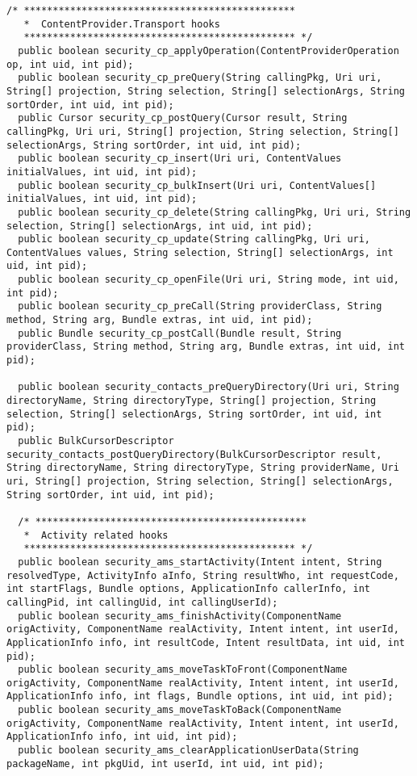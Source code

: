 \documentclass[letterpaper,twocolumn,10pt]{article}
\begin{document}
\begin{lstlisting}[emph={},basicstyle=\footnotesize,caption={Interface for Access Control Policy Modules}]
  /* ***********************************************
   *  ContentProvider.Transport hooks
   *********************************************** */
  public boolean security_cp_applyOperation(ContentProviderOperation op, int uid, int pid);
  public boolean security_cp_preQuery(String callingPkg, Uri uri, String[] projection, String selection, String[] selectionArgs, String sortOrder, int uid, int pid);
  public Cursor security_cp_postQuery(Cursor result, String callingPkg, Uri uri, String[] projection, String selection, String[] selectionArgs, String sortOrder, int uid, int pid);
  public boolean security_cp_insert(Uri uri, ContentValues initialValues, int uid, int pid);
  public boolean security_cp_bulkInsert(Uri uri, ContentValues[] initialValues, int uid, int pid);
  public boolean security_cp_delete(String callingPkg, Uri uri, String selection, String[] selectionArgs, int uid, int pid);
  public boolean security_cp_update(String callingPkg, Uri uri, ContentValues values, String selection, String[] selectionArgs, int uid, int pid);
  public boolean security_cp_openFile(Uri uri, String mode, int uid, int pid);
  public boolean security_cp_preCall(String providerClass, String method, String arg, Bundle extras, int uid, int pid);
  public Bundle security_cp_postCall(Bundle result, String providerClass, String method, String arg, Bundle extras, int uid, int pid);
  
  public boolean security_contacts_preQueryDirectory(Uri uri, String directoryName, String directoryType, String[] projection, String selection, String[] selectionArgs, String sortOrder, int uid, int pid);
  public BulkCursorDescriptor security_contacts_postQueryDirectory(BulkCursorDescriptor result, String directoryName, String directoryType, String providerName, Uri uri, String[] projection, String selection, String[] selectionArgs, String sortOrder, int uid, int pid);
  
  /* ***********************************************
   *  Activity related hooks
   *********************************************** */
  public boolean security_ams_startActivity(Intent intent, String resolvedType, ActivityInfo aInfo, String resultWho, int requestCode, int startFlags, Bundle options, ApplicationInfo callerInfo, int callingPid, int callingUid, int callingUserId);
  public boolean security_ams_finishActivity(ComponentName origActivity, ComponentName realActivity, Intent intent, int userId, ApplicationInfo info, int resultCode, Intent resultData, int uid, int pid);
  public boolean security_ams_moveTaskToFront(ComponentName origActivity, ComponentName realActivity, Intent intent, int userId, ApplicationInfo info, int flags, Bundle options, int uid, int pid);
  public boolean security_ams_moveTaskToBack(ComponentName origActivity, ComponentName realActivity, Intent intent, int userId, ApplicationInfo info, int uid, int pid);
  public boolean security_ams_clearApplicationUserData(String packageName, int pkgUid, int userId, int uid, int pid);
  

\end{lstlisting}
\end{document}
